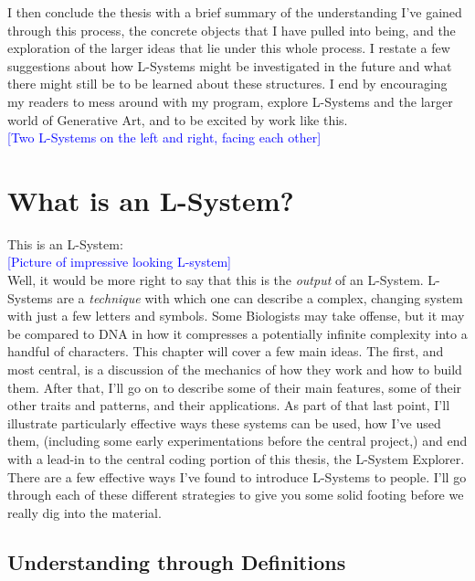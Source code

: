\documentclass[12pt,twoside]{reedthesis}
\begin{document}
	I then conclude the thesis with a brief summary of the understanding I've gained through this process, the concrete objects that I have pulled into being, and the exploration of the larger ideas that lie under this whole process. I restate a few suggestions about how L-Systems might be investigated in the future and what there might still be to be learned about these structures. I end by encouraging my readers to mess around with my program, explore L-Systems and the larger world of Generative Art, and to be excited by work like this.\\
	
	\textcolor{blue}{[Two L-Systems on the left and right, facing each other]}\\
	
\chapter{What is an L-System?}

This is an L-System:\\

\textcolor{blue}{[Picture of impressive looking L-system]}\\

	Well, it would be more right to say that this is the \textit{output} of an L-System. L-Systems are a \textit{technique} with which one can describe a complex, changing system with just a few letters and symbols. Some Biologists may take offense, but it may be compared to DNA in how it compresses a potentially infinite complexity into a handful of characters. This chapter will cover a few main ideas. The first, and most central, is a discussion of the mechanics of how they work and how to build them. After that, I’ll go on to describe some of their main features, some of their other traits and patterns, and their applications. As part of that last point, I’ll illustrate particularly effective ways these systems can be used, how I’ve used them, (including some early experimentations before the central project,) and end with a lead-in to the central coding portion of this thesis, the L-System Explorer.\\

	There are a few effective ways I've found to introduce L-Systems to people. I'll go through each of these different strategies to give you some solid footing before we really dig into the material.\\


\section{Understanding through Definitions}
\end{document}
